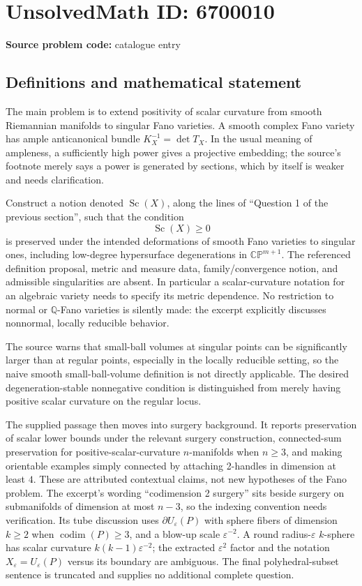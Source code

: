\documentclass[11pt]{article}
\begin{document}
\section*{UnsolvedMath ID: 6700010}
\textbf{Source problem code:} catalogue entry
\subsection{Definitions and mathematical statement}
The main problem is to extend positivity of scalar curvature from smooth Riemannian manifolds to singular Fano varieties. A smooth complex Fano variety has ample anticanonical bundle \(K_X^{-1}=\det T_X\). In the usual meaning of ampleness, a sufficiently high power gives a projective embedding; the source's footnote merely says a power is generated by sections, which by itself is weaker and needs clarification.

Construct a notion denoted \(\operatorname{Sc}(X)\), along the lines of ``Question 1 of the previous section'', such that the condition
\[
 \operatorname{Sc}(X)\ge0
\]
is preserved under the intended deformations of smooth Fano varieties to singular ones, including low-degree hypersurface degenerations in \(\mathbb{CP}^{m+1}\). The referenced definition proposal, metric and measure data, family/convergence notion, and admissible singularities are absent. In particular a scalar-curvature notation for an algebraic variety needs to specify its metric dependence. No restriction to normal or \(\mathbb Q\)-Fano varieties is silently made: the excerpt explicitly discusses nonnormal, locally reducible behavior.

The source warns that small-ball volumes at singular points can be significantly larger than at regular points, especially in the locally reducible setting, so the naive smooth small-ball-volume definition is not directly applicable. The desired degeneration-stable nonnegative condition is distinguished from merely having positive scalar curvature on the regular locus.

The supplied passage then moves into surgery background. It reports preservation of scalar lower bounds under the relevant surgery construction, connected-sum preservation for positive-scalar-curvature \(n\)-manifolds when \(n\ge3\), and making orientable examples simply connected by attaching 2-handles in dimension at least \(4\). These are attributed contextual claims, not new hypotheses of the Fano problem. The excerpt's wording ``codimension 2 surgery'' sits beside surgery on submanifolds of dimension at most \(n-3\), so the indexing convention needs verification. Its tube discussion uses \(\partial U_\varepsilon(P)\) with sphere fibers of dimension \(k\ge2\) when \(\operatorname{codim}(P)\ge3\), and a blow-up scale \(\varepsilon^{-2}\). A round radius-\(\varepsilon\) \(k\)-sphere has scalar curvature \(k(k-1)\varepsilon^{-2}\); the extracted \(\varepsilon^2\) factor and the notation \(X_\varepsilon=U_\varepsilon(P)\) versus its boundary are ambiguous. The final polyhedral-subset sentence is truncated and supplies no additional complete question.
\end{document}
